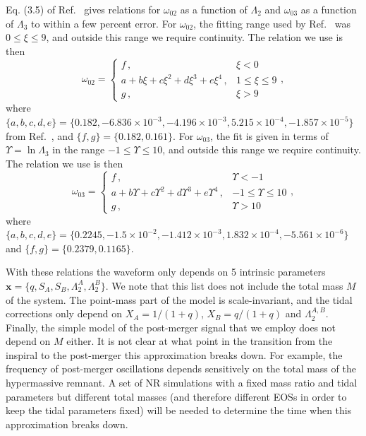 \documentclass[prd,aps,letter,twocolumn,floatfix,notitlepage,nofootinbib]{revtex4-1}
\def\bx{\mathbf{x}}
\begin{document}
Eq. (3.5) of Ref.~\cite{Chan:2014kua} gives relations for $\omega_{02}$ as a function of $\Lambda_2$ and $\omega_{03}$ as a function of $\Lambda_3$ to within a few percent error. For $\omega_{02}$, the fitting range used by Ref.~\cite{Chan:2014kua} was $0\leq \xi \leq 9$, and outside this range we require continuity. The relation we use is then
\begin{equation}
\omega_{02} = \left\{\begin{array}{ll}
f\, , & \xi < 0 \\
a + b\xi + c\xi^2 + d\xi^3 + e\xi^4\, , & 1 \le \xi \le 9 \\
g\, , & \xi > 9
\end{array}\right.,
\end{equation}
where $\{a, b, c, d, e\} = \{0.182, -6.836\times10^{-3}, -4.196\times10^{-3}, 5.215\times10^{-4}, -1.857\times10^{-5}\}$ from Ref.~\cite{Chan:2014kua}, and $\{f, g\}=\{0.182, 0.161\}$. For $\omega_{03}$, the fit is given in terms of $\Upsilon=\ln\Lambda_3$ in the range $-1\leq \Upsilon \leq 10$, and outside this range we require continuity. The relation we use is then
\begin{equation}
\omega_{03} = \left\{\begin{array}{ll}
f\, , & \Upsilon < -1 \\
a + b\Upsilon + c\Upsilon^2 + d\Upsilon^3 + e\Upsilon^4\, , & -1 \le \Upsilon \le 10 \\
g\, , & \Upsilon > 10
\end{array}\right.,
\end{equation}
where $\{a, b, c, d, e\} = \{0.2245, -1.5\times10^{-2}, -1.412\times10^{-3}, 1.832\times10^{-4}, -5.561\times10^{-6}\}$ and $\{f, g\}=\{0.2379, 0.1165\}$.

With these relations the waveform only depends on 5 intrinsic parameters $\bx=\{q, S_A, S_B, \Lambda_2^A,\Lambda_2^B\}$. We note that this list does not include the total mass $M$ of the system. The point-mass part of the model is scale-invariant, and the tidal corrections only depend on $X_A=1/(1+q)$, $X_B=q/(1+q)$ and $\Lambda_2^{A,B}$. Finally, the simple model of the post-merger signal that we employ does not depend on $M$ either. It is not clear at what point in the transition from the inspiral to the post-merger this approximation breaks down. For example, the frequency of post-merger oscillations depends sensitively on the total mass of the hypermassive remnant. A set of NR simulations with a fixed mass ratio and tidal parameters but different total masses (and therefore different EOSs in order to keep the tidal parameters fixed) will be needed to determine the time when this approximation breaks down.
\end{document}

